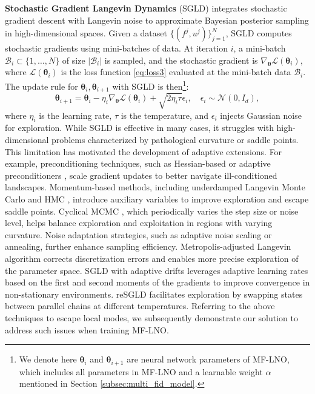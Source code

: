 \textbf{Stochastic Gradient Langevin Dynamics} (SGLD) integrates stochastic gradient descent with Langevin noise to approximate Bayesian posterior sampling in high-dimensional spaces. Given a dataset $\{(f^j, u^j)\}_{j=1}^{N}$, SGLD computes stochastic gradients using mini-batches of data. At iteration $i$, a mini-batch $\mathcal{B}_i \subset \{1, \dots, N\}$ of size $|\mathcal{B}_i|$ is sampled, and the stochastic gradient is $\nabla_{\boldsymbol{\theta}} {\mathcal{L}}({\boldsymbol{\theta}}_i)$, where $\mathcal{L}({\boldsymbol{\theta}}_i)$ is the loss function \eqref{eq:loss3} evaluated at the mini-batch data $\mathcal{B}_i$. The update rule for ${\boldsymbol{\theta}}_i,{\boldsymbol{\theta}}_{i+1}$ with SGLD is then\footnote{We denote here ${\boldsymbol{\theta}}_i$ and ${\boldsymbol{\theta}}_{i+1}$ are neural network parameters of MF-LNO, which includes all parameters in MF-LNO and a learnable weight $\alpha$ mentioned in Section \ref{subsec:multi_fid_model}.}: 
\begin{equation*}
{\boldsymbol{\theta}}_{i+1} = {\boldsymbol{\theta}}_i - \eta_i \nabla_{\boldsymbol{\theta}} \mathcal{L}({\boldsymbol{\theta}}_i) + \sqrt{2 \eta_i \tau} \epsilon_{i}, \quad \epsilon_{i} \sim \mathcal{N}(0, I_d),
\end{equation*}
where $\eta_i$ is the learning rate, $\tau$ is the temperature, and $\epsilon_i$ injects Gaussian noise for exploration. While SGLD is effective in many cases, it struggles with high-dimensional problems characterized by pathological curvature or saddle points. This limitation has motivated the development of adaptive extensions. For example, preconditioning techniques, such as Hessian-based or adaptive preconditioners \citep{girolami2011riemann, li2016preconditioned, deng2019}, scale gradient updates to better navigate ill-conditioned landscapes. Momentum-based methods, including underdamped Langevin Monte Carlo \citep{cheng2018underdamped, zhang2023improved, zheng2024accelerating} and HMC \citep{neal2011mcmc, tanqi2014stochastic, hoffman2014no}, introduce auxiliary variables to improve exploration and escape saddle points. Cyclical MCMC \citep{zhangcyclical}, which periodically varies the step size or noise level, helps balance exploration and exploitation in regions with varying curvature. Noise adaptation strategies, such as adaptive noise scaling \citep{ma2015complete} or annealing, further enhance sampling efficiency. Metropolis-adjusted Langevin algorithm \citep{dwivedi2019log, chewi2021optimal} corrects discretization errors and enables more precise exploration of the parameter space. SGLD with adaptive drifts \citep{kim2022stochastic, ishfaq2024provable} leverages adaptive learning rates based on the first and second moments of the gradients to improve convergence in non-stationary environments. reSGLD \citep{jingdong2, deng2020accelerating} facilitates exploration by swapping states between parallel chains at different temperatures. Referring to the above techniques to escape local modes, we subsequently demonstrate our solution to address such issues when training MF-LNO.

